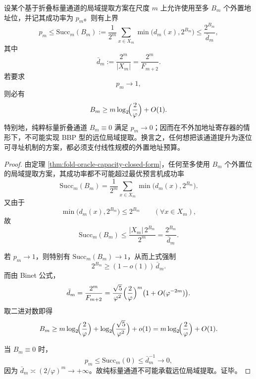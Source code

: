 \begin{theorem}[远位局域提取的线性外置地址预算壁垒]\label{thm:conclusion-foldgauge-local-extraction-budget-barrier}
设某个基于折叠标量通道的局域提取方案在尺度 \(m\) 上允许使用至多 \(B_m\) 个外置地址位，并记其成功率为 \(p_m\)。则有上界
\[
p_m\le
\mathrm{Succ}_m(B_m)
:=
\frac{1}{2^m}\sum_{x\in X_m}\min\bigl(d_m(x),2^{B_m}\bigr)
\le
\frac{2^{B_m}}{\bar d_m},
\]
其中
\[
\bar d_m:=\frac{2^m}{|X_m|}
=
\frac{2^m}{F_{m+2}}.
\]
若要求
\[
p_m\longrightarrow 1,
\]
则必有
\[
B_m\ge m\log_2\!\Bigl(\frac{2}{\varphi}\Bigr)+O(1).
\]
特别地，纯粹标量折叠通道 \(B_m\equiv 0\) 满足 \(p_m\to 0\)；因而在不外加地址寄存器的情形下，不可能实现 BBP 型的远位局域提取。换言之，任何想把该通道提升为逐位可寻址机制的方案，都必须支付线性规模的外置地址预算。
\end{theorem}
\begin{proof}
由定理 \ref{thm:fold-oracle-capacity-closed-form}，任何至多使用 \(B_m\) 个外置位的局域提取方案，其成功率都不可能超过最优预言机成功率
\[
\mathrm{Succ}_m(B_m)
=
\frac{1}{2^m}\sum_{x\in X_m}\min\bigl(d_m(x),2^{B_m}\bigr).
\]
又由于
\[
\min\bigl(d_m(x),2^{B_m}\bigr)\le 2^{B_m}
\qquad (\forall x\in X_m),
\]
故
\[
\mathrm{Succ}_m(B_m)
\le
\frac{|X_m|\,2^{B_m}}{2^m}
=
\frac{2^{B_m}}{\bar d_m}.
\]

若 \(p_m\to 1\)，则特别有 \(\mathrm{Succ}_m(B_m)\to 1\)，从而上式强制
\[
2^{B_m}\ge (1-o(1))\,\bar d_m.
\]
而由 Binet 公式，
\[
\bar d_m
=
\frac{2^m}{F_{m+2}}
=
\frac{\sqrt5}{\varphi^2}
\Bigl(\frac{2}{\varphi}\Bigr)^m
\bigl(1+O(\varphi^{-2m})\bigr).
\]
取二进对数即得
\[
B_m
\ge
m\log_2\!\Bigl(\frac{2}{\varphi}\Bigr)
+\log_2\!\Bigl(\frac{\sqrt5}{\varphi^2}\Bigr)
+o(1)
=
m\log_2\!\Bigl(\frac{2}{\varphi}\Bigr)+O(1).
\]

当 \(B_m\equiv 0\) 时，
\[
p_m\le \mathrm{Succ}_m(0)\le \bar d_m^{-1}\to 0,
\]
因为 \(\bar d_m\asymp (2/\varphi)^m\to +\infty\)。故纯标量通道不可能承载远位局域提取。证毕。
\end{proof}




